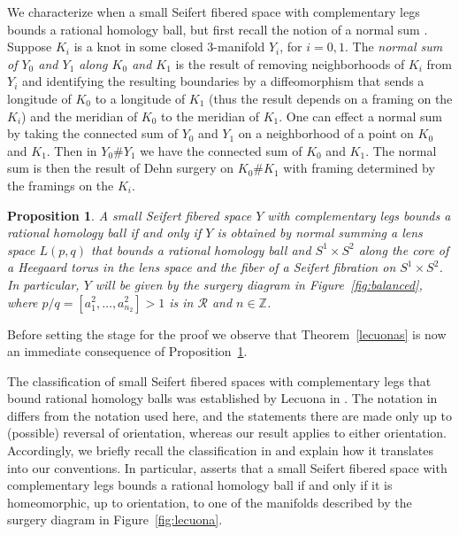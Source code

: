 \documentclass[11pt]{amsart}
\theoremstyle{plain}
\newtheorem{proposition}[theorem]{Proposition}
\theoremstyle{definition}
\theoremstyle{remark}
\numberwithin{theorem}{section}
\newcommand{\dfn}[1]{{\em #1}}        %
\newcommand{\Z}{\mathbb{Z}}           %
\begin{document}
We characterize when a small Seifert fibered space with complementary legs bounds a rational homology ball, but first recall the notion of a normal sum \cite{Gompf1995}. Suppose $K_i$ is a knot in some closed $3$-manifold $Y_i$,  for $i=0,1$. The \dfn{normal sum of $Y_0$ and $Y_1$ along $K_0$ and $K_1$} is the result of removing neighborhoods of $K_i$ from $Y_i$ and identifying the resulting boundaries by a diffeomorphism that sends a longitude of $K_0$ to a longitude of $K_1$ (thus the result depends on a framing on the $K_i$) and the meridian of $K_0$ to the meridian of $K_1$. One can effect a normal sum by taking the connected sum of $Y_0$ and $Y_1$ on a neighborhood of a point on $K_0$ and $K_1$. Then in $Y_0\# Y_1$ we have the connected sum of $K_0$ and $K_1$. The normal sum is then the result of Dehn surgery on $K_0\# K_1$ with framing determined by the framings on the $K_i$. 


\begin{proposition}\label{bound} 
A small Seifert fibered space $Y$ with complementary legs bounds a rational homology ball if and only if $Y$ is obtained by normal summing a lens space $L(p,q)$ that bounds a rational homology ball and $S^1\times S^2$ along the core of a Heegaard torus in the lens space and the fiber of a Seifert fibration on $S^1\times S^2$. In particular, $Y$  will be given by the surgery diagram in Figure~\ref{fig:balanced}, where $p/q=[a^2_1,\ldots, a^2_{n_2}]>1$ is in $\mathcal{R}$ and $n\in\Z$.
\end{proposition}

Before setting the stage for the proof we observe that Theorem~\ref{lecuonas} is now an immediate consequence of Proposition~\ref{bound}.

The classification of small Seifert fibered spaces with complementary legs
that bound rational homology balls was established by Lecuona in
\cite[Corollary~3.3]{Lecuona2019}. The notation in \cite{Lecuona2019}
differs from the notation used here, and the statements there are made
only up to (possible) reversal of orientation, whereas our result applies
to either orientation. Accordingly, we briefly recall the classification
in \cite[Corollary~3.3]{Lecuona2019} and explain how it translates into
our conventions. In particular, \cite[Corollary~3.3]{Lecuona2019} asserts
that a small Seifert fibered space with complementary legs bounds a rational
homology ball if and only if it is homeomorphic, up to orientation, to
one of the manifolds described by the surgery diagram in
Figure~\ref{fig:lecuona}.
\end{document}
